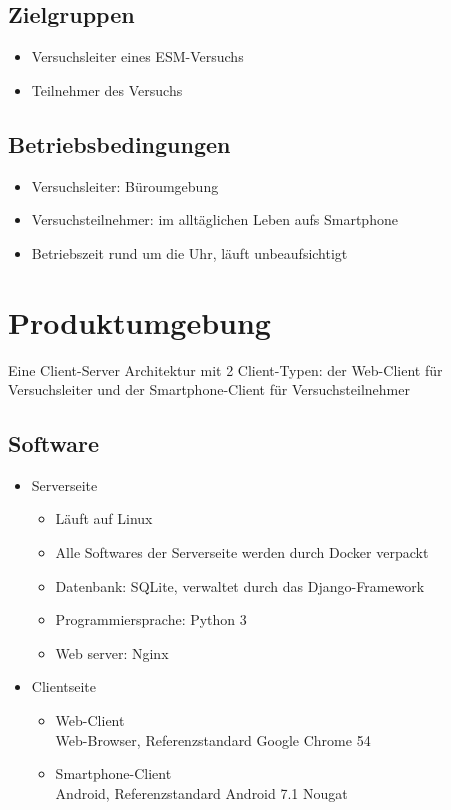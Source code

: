 \documentclass[a4paper]{scrreprt}
\begin{document}
        \section{Zielgruppen}
            \begin{itemize}
                \item Versuchsleiter eines ESM-Versuchs
                \item Teilnehmer des Versuchs
            \end{itemize}
 
        \section{Betriebsbedingungen}
            \begin{itemize}
                \item Versuchsleiter: Büroumgebung
                \item Versuchsteilnehmer: im alltäglichen Leben aufs Smartphone
                \item Betriebszeit rund um die Uhr, läuft unbeaufsichtigt
            \end{itemize}
 
    \chapter{Produktumgebung}
        Eine Client-Server Architektur mit 2 Client-Typen: der Web-Client für Versuchsleiter und der Smartphone-Client für Versuchsteilnehmer

        \section{Software}
            \begin{itemize}
                \item Serverseite
                    \begin{itemize}
                        \item  Läuft auf Linux
                        \item Alle Softwares der Serverseite werden durch Docker verpackt
                        \item Datenbank: SQLite, verwaltet durch das Django-Framework
                        \item Programmiersprache: Python 3
                        \item Web server: Nginx
                    \end{itemize}
                \item Clientseite
                    \begin{itemize}
                        \item Web-Client\\
                             Web-Browser, Referenzstandard Google Chrome 54
                        \item  Smartphone-Client\\
                             Android, Referenzstandard Android 7.1 Nougat
                    \end{itemize}
            \end{itemize}
 
\end{document}
